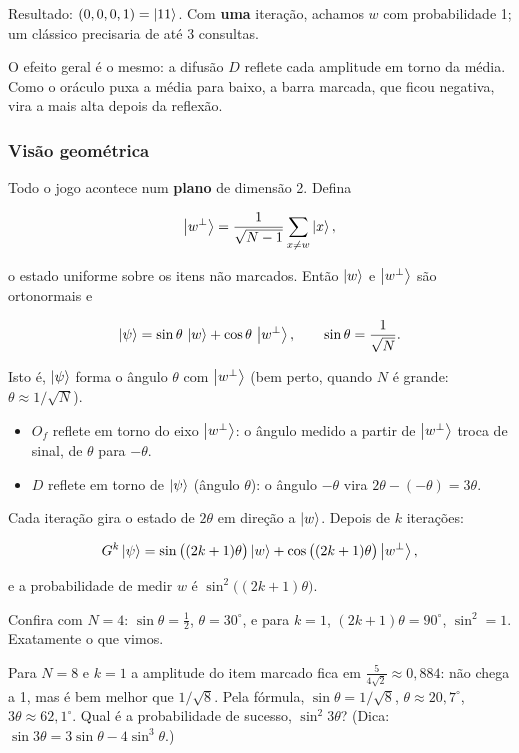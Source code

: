Resultado: \((0,0,0,1)=\left|{11}\right>\). Com \textbf{uma} iteração, achamos \(w\) com probabilidade 1; um clássico precisaria de até 3 consultas.

O efeito geral é o mesmo: a difusão \(D\) reflete cada amplitude em torno da média. Como o oráculo puxa a média para baixo, a barra marcada, que ficou negativa, vira a mais alta depois da reflexão.

\subsubsection{Visão geométrica}\label{visuxe3o-geomuxe9trica}

Todo o jogo acontece num \textbf{plano} de dimensão 2. Defina

\[
\left|{w^\perp}\right>=\frac{1}{\sqrt{N-1}}\sum_{x\ne w}\left|{x}\right>,
\]

o estado uniforme sobre os itens não marcados. Então \(\left|{w}\right>\) e \(\left|{w^\perp}\right>\) são ortonormais e

\[
\left|{\psi}\right>=\sin\theta\,\left|{w}\right>+\cos\theta\,\left|{w^\perp}\right>,\qquad \sin\theta=\frac{1}{\sqrt N}.
\]

Isto é, \(\left|{\psi}\right>\) forma o ângulo \(\theta\) com \(\left|{w^\perp}\right>\) (bem perto, quando \(N\) é grande: \(\theta\approx1/\sqrt N\)).

\begin{itemize}
\tightlist
\item
  \(O_f\) reflete em torno do eixo \(\left|{w^\perp}\right>\): o ângulo medido a partir de \(\left|{w^\perp}\right>\) troca de sinal, de \(\theta\) para \(-\theta\).
\item
  \(D\) reflete em torno de \(\left|{\psi}\right>\) (ângulo \(\theta\)): o ângulo \(-\theta\) vira \(2\theta-(-\theta)=3\theta\).
\end{itemize}

Cada iteração gira o estado de \(2\theta\) em direção a \(\left|{w}\right>\). Depois de \(k\) iterações:

\[
G^k\left|{\psi}\right>=\sin\big((2k+1)\theta\big)\left|{w}\right>+\cos\big((2k+1)\theta\big)\left|{w^\perp}\right>,
\]

e a probabilidade de medir \(w\) é \(\sin^2\!\big((2k+1)\theta\big)\).

Confira com \(N=4\): \(\sin\theta=\tfrac12\), \(\theta=30^\circ\), e para \(k=1\), \((2k+1)\theta=90^\circ\), \(\sin^2=1\). Exatamente o que vimos.

Para \(N=8\) e \(k=1\) a amplitude do item marcado fica em \(\tfrac{5}{4\sqrt2}\approx0{,}884\): não chega a 1, mas é bem melhor que \(1/\sqrt8\). Pela fórmula, \(\sin\theta=1/\sqrt8\), \(\theta\approx20{,}7^\circ\), \(3\theta\approx62{,}1^\circ\). Qual é a probabilidade de sucesso, \(\sin^2 3\theta\)? (Dica: \(\sin3\theta=3\sin\theta-4\sin^3\theta\).)

